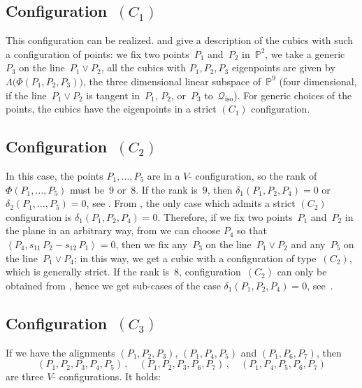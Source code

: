 \documentclass[a4paper, 11pt, reqno]{amsart}
\theoremstyle{plain}
\theoremstyle{definition}
\newcommand{\p}{\mathbb{P}}
\newcommand{\iso}{\mathcal{Q}_{\mathrm{iso}}}
\newcommand{\scl}[2]{\left\langle {#1}, {#2} \right\rangle}
\begin{document}
\subsection*{Configuration~\texorpdfstring{$(C_1)$}{C1}}
This configuration can be realized.  and 
give a description of the cubics with such a configuration of points:
we fix two points~$P_1$ and~$P_2$ in~$\p^2$, we take a generic~$P_3$
on the line~$P_1 \vee P_2$, all the cubics with
$P_1, P_2, P_3$ eigenpoints are given by $\Lambda \bigl( \Phi(P_1, P_2, P_3) \bigr)$, the three
dimensional linear subspace of~$\p^9$ (four dimensional, if the
line~$P_1 \vee P_2$ is tangent in~$P_1$, $P_2$, or~$P_3$ to~$\iso$). For generic choices of the points, the cubics have the eigenpoints in a strict 
$(C_1)$ configuration.

\subsection*{Configuration~\texorpdfstring{$(C_2)$}{C2}}
In this case, the points
$P_1, \dots, P_5$ are in a
$V$- configuration, so the rank of~$\Phi(P_1, \dotsc, P_5)$
must be~$9$ or~$8$. If the rank is~$9$, then $\delta_1(P_1, P_2, P_4) = 0$
or $\delta_2(P_1, \dotsc, P_5) = 0$, see .
From , the only case
which admits a strict $(C_2)$ configuration 
is $\delta_1(P_1, P_2, P_4) = 0$. Therefore, if we fix two points~$P_1$ and~$P_2$
in the plane in an arbitrary way, from  we can choose $P_4$ so that
$\scl{P_4}{s_{11}\, P_2 - s_{12} \, P_1}=0$, then we fix any~$P_3$
on the line~$P_1 \vee P_2$ and any~$P_5$ on the line~$P_1 \vee P_4$; in this way, we get a cubic with a configuration of type~$(C_2)$, which is generally strict. If the rank is~$8$, configuration~$(C_2)$ can only be obtained from , hence we get sub-cases of the case $\delta_1(P_1, P_2, P_4)=0$, see~.


\subsection*{Configuration~\texorpdfstring{$(C_3)$}{C3}}
If we have the alignments $(P_1, P_2, P_3)$, $(P_1, P_4, P_5)$ and $(P_1, P_6, P_7)$, then
%
\[
 (P_1, P_2, P_3, P_4, P_5) \,, \quad (P_1, P_2, P_3, P_6, P_7) \,, \quad (P_1, P_4, P_5, P_6, P_7)
\]
%
are three $V$- configurations. It holds:
\end{document}

